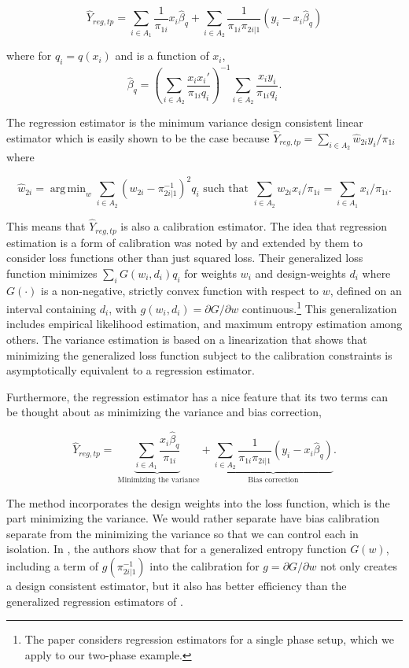 \documentclass[12pt]{article}
\DeclareMathOperator*{\argmin}{arg\,min}
\begin{document}
$$ \hat Y_{reg, tp} 
= \sum_{i \in A_1} \frac{1}{\pi_{1i}} x_i \hat \beta_q+ \sum_{i \in A_2}
\frac{1}{\pi_{1i}\pi_{2i|1}} (y_i - x_i \hat \beta_q)$$

where for $q_i = q(x_i)$ and is a function of $x_i$,
$$
\hat \beta_q = \left(\sum_{i \in A_2} 
  \frac{x_i x_i'}{\pi_{1i} q_i}\right)^{-1} 
\sum_{i \in A_2} \frac{x_i y_i}{\pi_{1i} q_i}.$$ 

The regression estimator is the minimum variance design consistent linear
estimator which is easily shown to be the case because $\hat Y_{reg, tp} =
\sum_{i \in A_2} \hat w_{2i} y_i / \pi_{1i}$ where 

$$\hat w_{2i} = \argmin_{w} \sum_{i \in A_2} (w_{2i} - \pi_{2i|1}^{-1})^2 q_i \text{ such
that } \sum_{i \in A_2} w_{2i} x_i / \pi_{1i} = \sum_{i \in A_1} x_i / \pi_{1i}.$$

This means that $\hat Y_{reg, tp}$ is also a calibration estimator. The idea
that regression estimation is a form of calibration was noted by
\cite{deville1992calibration} and extended by them to consider loss functions
other than just squared loss. Their generalized loss function minimizes
$\sum_i G(w_i, d_i)q_i$ for weights $w_i$ and design-weights $d_i$ where
$G(\cdot)$ is a non-negative, strictly convex function with respect to $w$,
defined on an interval containing $d_i$, with $g(w_i, d_i) = \partial G /
\partial w$ continuous.\footnote{The \cite{deville1992calibration} paper
considers regression estimators for a single phase setup, which we apply to our
two-phase example.} This
generalization includes empirical likelihood estimation, and maximum entropy
estimation among others. The variance estimation is based on a linearization
that shows that minimizing the generalized loss function subject to the
calibration constraints is asymptotically equivalent to a regression estimator.

Furthermore, the regression estimator
has a nice feature that its two terms can be thought about as minimizing the
variance and bias correction,

$$ \hat Y_{reg, tp} 
= \underbrace{\sum_{i \in A_1} \frac{x_i \hat \beta_q}{\pi_{1i}}}_{
  \text{ Minimizing the variance}} + \underbrace{\sum_{i \in A_2}
\frac{1}{\pi_{1i}\pi_{2i|1}} (y_i - x_i \hat \beta_q)}_{
\text{Bias correction}}.$$

The \cite{deville1992calibration} method incorporates the design weights into
the loss function, which is the part minimizing the variance. We would rather
separate have bias calibration separate from the minimizing the variance so that
we can control each in isolation. In
\cite{kwon2024debiased}, the authors show that for a generalized entropy
function $G(w)$, including a term of $g(\pi_{2i|1}^{-1})$ into the calibration
for $g = \partial G / \partial w$ not only creates a design consistent
estimator, but it also has better efficiency than the generalized regression
estimators of \cite{deville1992calibration}.
\end{document}
